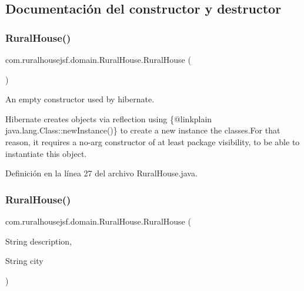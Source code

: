 \subsection{Documentación del constructor y destructor}
\mbox{\label{classcom_1_1ruralhousejsf_1_1domain_1_1_rural_house_a6312a6b35355d7883853544db74662f8}} 
\subsubsection{\texorpdfstring{RuralHouse()}{RuralHouse()}\hspace{0.1cm}{\footnotesize\ttfamily [1/3]}}
{\footnotesize\ttfamily com.\+ruralhousejsf.\+domain.\+Rural\+House.\+Rural\+House (\begin{DoxyParamCaption}{ }\end{DoxyParamCaption})\hspace{0.3cm}{\ttfamily [package]}}

An empty constructor used by hibernate. 

Hibernate creates objects via reflection using \{@linkplain java.\+lang.\+Class\+::new\+Instance()\} to create a new instance the classes.\+For that reason, it requires a no-\/arg constructor of at least package visibility, to be able to instantiate this object. 

Definición en la línea 27 del archivo Rural\+House.\+java.

\mbox{\label{classcom_1_1ruralhousejsf_1_1domain_1_1_rural_house_aa3488a4d0e876307f91f80784a5538a5}} 
\subsubsection{\texorpdfstring{RuralHouse()}{RuralHouse()}\hspace{0.1cm}{\footnotesize\ttfamily [2/3]}}
{\footnotesize\ttfamily com.\+ruralhousejsf.\+domain.\+Rural\+House.\+Rural\+House (\begin{DoxyParamCaption}\item[{String}]{description,  }\item[{String}]{city }\end{DoxyParamCaption})}

